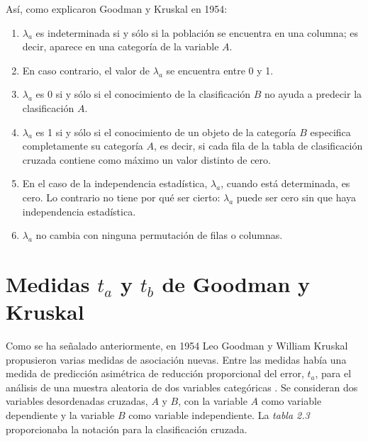 \documentclass[12pt,a4paper,]{book}
\numberwithin{dummy}{section}
\theoremstyle{ocrenumbox}
\theoremstyle{blacknumex}
\theoremstyle{blacknumbox}
\theoremstyle{ocrenum}
\theoremstyle{ocrenum}
\begin{document}
Así, como explicaron Goodman y Kruskal en 1954:

\begin{enumerate}
\def\labelenumi{\arabic{enumi}.}
\item
  \(\lambda_a\) es indeterminada si y sólo si la población se encuentra
  en una columna; es decir, aparece en una categoría de la variable
  \(A\).
\item
  En caso contrario, el valor de \(\lambda_a\) se encuentra entre 0 y 1.
\item
  \(\lambda_a\) es 0 si y sólo si el conocimiento de la clasificación
  \(B\) no ayuda a predecir la clasificación \(A\).
\item
  \(\lambda_a\) es 1 si y sólo si el conocimiento de un objeto de la
  categoría \(B\) especifica completamente su categoría \(A\), es decir,
  si cada fila de la tabla de clasificación cruzada contiene como máximo
  un valor distinto de cero.
\item
  En el caso de la independencia estadística, \(\lambda_a\), cuando está
  determinada, es cero. Lo contrario no tiene por qué ser cierto:
  \(\lambda_a\) puede ser cero sin que haya independencia estadística.
\item
  \(\lambda_a\) no cambia con ninguna permutación de filas o columnas.
\end{enumerate}

\hypertarget{medidas-t_a-y-t_b-de-goodman-y-kruskal}{%
\section{\texorpdfstring{Medidas \(t_a\) y \(t_b\) de Goodman y
Kruskal}{Medidas t\_a y t\_b de Goodman y Kruskal}}\label{medidas-t_a-y-t_b-de-goodman-y-kruskal}}

Como se ha señalado anteriormente, en 1954 Leo Goodman y William Kruskal
propusieron varias medidas de asociación nuevas. Entre las medidas había
una medida de predicción asimétrica de reducción proporcional del error,
\(t_a\), para el análisis de una muestra aleatoria de dos variables
categóricas \citep{Goodman1}. Se consideran dos variables desordenadas
cruzadas, \(A\) y \(B\), con la variable \(A\) como variable dependiente
y la variable \(B\) como variable independiente. La \emph{tabla 2.3}
proporcionaba la notación para la clasificación cruzada.
\end{document}

